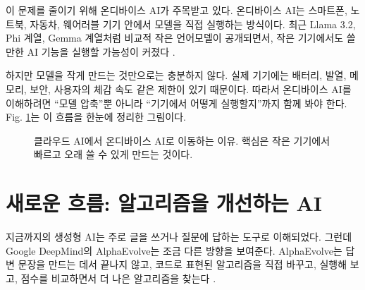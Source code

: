 \documentclass[twocolumn,10pt]{article}
\begin{document}
이 문제를 줄이기 위해 온디바이스 AI가 주목받고 있다. 온디바이스 AI는 스마트폰, 노트북, 자동차, 웨어러블 기기 안에서 모델을 직접 실행하는 방식이다. 최근 Llama 3.2, Phi 계열, Gemma 계열처럼 비교적 작은 언어모델이 공개되면서, 작은 기기에서도 쓸 만한 AI 기능을 실행할 가능성이 커졌다 \cite{llama32_2024,phi4_2025,gemma3_2025}.

하지만 모델을 작게 만드는 것만으로는 충분하지 않다. 실제 기기에는 배터리, 발열, 메모리, 보안, 사용자의 체감 속도 같은 제한이 있기 때문이다. 따라서 온디바이스 AI를 이해하려면 ``모델 압축''뿐 아니라 ``기기에서 어떻게 실행할지''까지 함께 봐야 한다. Fig. \ref{fig:ko_bigpicture}는 이 흐름을 한눈에 정리한 그림이다.

\begin{figure}[H]
\centering
{}
\caption{클라우드 AI에서 온디바이스 AI로 이동하는 이유. 핵심은 작은 기기에서 빠르고 오래 쓸 수 있게 만드는 것이다.}
\label{fig:ko_bigpicture}
\end{figure}

\section{새로운 흐름: 알고리즘을 개선하는 AI}
지금까지의 생성형 AI는 주로 글을 쓰거나 질문에 답하는 도구로 이해되었다. 그런데 Google DeepMind의 AlphaEvolve는 조금 다른 방향을 보여준다. AlphaEvolve는 답변 문장을 만드는 데서 끝나지 않고, 코드로 표현된 알고리즘을 직접 바꾸고, 실행해 보고, 점수를 비교하면서 더 나은 알고리즘을 찾는다 \cite{deepmind_alphaevolve_2025}.
\end{document}
